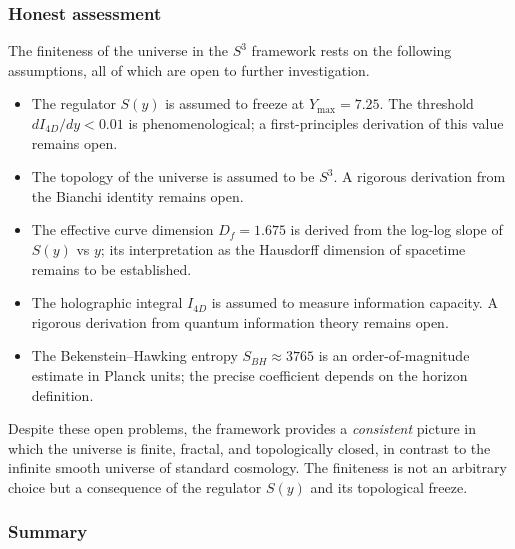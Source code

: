 \documentclass[a4paper,7pt,oneside,openany]{book}
\begin{document}
\subsubsection{Honest assessment}

The finiteness of the universe in the $S^{3}$ framework rests 
on the following assumptions, all of which are open to further 
investigation.

\begin{itemize}
\item The regulator $S(y)$ is assumed to freeze at 
$Y_{\max}=7.25$. The threshold $dI_{4D}/dy<0.01$ is 
phenomenological; a first-principles derivation of this value 
remains open.
\item The topology of the universe is assumed to be $S^{3}$. A 
rigorous derivation from the Bianchi identity remains open.
\item The effective curve dimension $D_{f}=1.675$ is derived 
from the log-log slope of $S(y)$ vs $y$; its interpretation as 
the Hausdorff dimension of spacetime remains to be established.
\item The holographic integral $I_{4D}$ is assumed to measure 
information capacity. A rigorous derivation from quantum 
information theory remains open.
\item The Bekenstein--Hawking entropy $S_{BH}\approx 3765$ is an 
order-of-magnitude estimate in Planck units; the precise 
coefficient depends on the horizon definition.
\end{itemize}

Despite these open problems, the framework provides a 
\emph{consistent} picture in which the universe is finite, 
fractal, and topologically closed, in contrast to the infinite 
smooth universe of standard cosmology. The finiteness is not an 
arbitrary choice but a consequence of the regulator $S(y)$ and 
its topological freeze.

\subsubsection{Summary}
\end{document}
